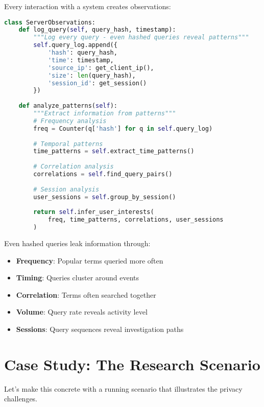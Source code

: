 Every interaction with a system creates observations:

\begin{lstlisting}[language=Python, caption={What servers observe even with encryption}]
class ServerObservations:
    def log_query(self, query_hash, timestamp):
        """Log every query - even hashed queries reveal patterns"""
        self.query_log.append({
            'hash': query_hash,
            'time': timestamp,
            'source_ip': get_client_ip(),
            'size': len(query_hash),
            'session_id': get_session()
        })
    
    def analyze_patterns(self):
        """Extract information from patterns"""
        # Frequency analysis
        freq = Counter(q['hash'] for q in self.query_log)
        
        # Temporal patterns  
        time_patterns = self.extract_time_patterns()
        
        # Correlation analysis
        correlations = self.find_query_pairs()
        
        # Session analysis
        user_sessions = self.group_by_session()
        
        return self.infer_user_interests(
            freq, time_patterns, correlations, user_sessions
        )
\end{lstlisting}

Even hashed queries leak information through:
\begin{itemize}
\item \textbf{Frequency}: Popular terms queried more often
\item \textbf{Timing}: Queries cluster around events
\item \textbf{Correlation}: Terms often searched together
\item \textbf{Volume}: Query rate reveals activity level
\item \textbf{Sessions}: Query sequences reveal investigation paths
\end{itemize}

\section{Case Study: The Research Scenario}

Let's make this concrete with a running scenario that illustrates the privacy challenges.

